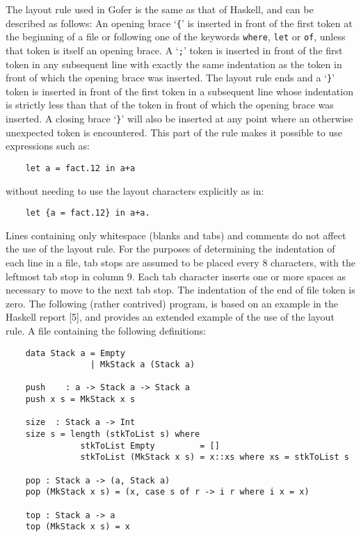 The layout rule used in Gofer is the same as that of Haskell,  and  can
be described as follows:
\BI
\IT  An opening brace `\verb"{"' is inserted in front of the  first  token  at
     the beginning of a file or following one of the keywords  \verb"where",
     \verb"let" or \verb"of", unless that token is itself an opening brace.
\IT  A `\verb";"' token is inserted in front of the first token in any subsequent
     line with exactly the same indentation as the token  in  front  of
     which the opening brace was inserted.
\IT  The layout rule ends and a `\verb"}"' token is inserted in front  of  the
     first token in a subsequent line  whose  indentation  is  strictly
     less than that of the token in front of which  the  opening  brace
     was inserted.
\IT  A closing brace `\verb"}"' will also be inserted at any  point  where  an
     otherwise unexpected token is encountered.  This part of the rule
     makes it possible to use expressions such as:
\begin{verbatim}
    let a = fact.12 in a+a
\end{verbatim}
     without needing to use the layout characters explicitly as in:
\begin{verbatim}
    let {a = fact.12} in a+a.
\end{verbatim}
\IT  Lines containing only whitespace (blanks and tabs) and comments do
     not affect the use of the layout rule.
\IT  For the purposes of determining the indentation of each line in  a
     file, tab stops are assumed to be placed every 8 characters,  with
     the leftmost tab stop in column 9.  Each tab character inserts one
     or more spaces as necessary to move to the next tab stop.
\IT  The indentation of the end of file token is zero.
\EI
The following (rather contrived) program, is based on an example in the
Haskell report [5], and provides an extended example of the use of  the
layout rule.  A file containing the following definitions:
\begin{verbatim}
    data Stack a = Empty
                 | MkStack a (Stack a)

    push    : a -> Stack a -> Stack a
    push x s = MkStack x s

    size  : Stack a -> Int
    size s = length (stkToList s) where
               stkToList Empty         = []
               stkToList (MkStack x s) = x::xs where xs = stkToList s

    pop : Stack a -> (a, Stack a)
    pop (MkStack x s) = (x, case s of r -> i r where i x = x)

    top : Stack a -> a
    top (MkStack x s) = x
\end{verbatim}
